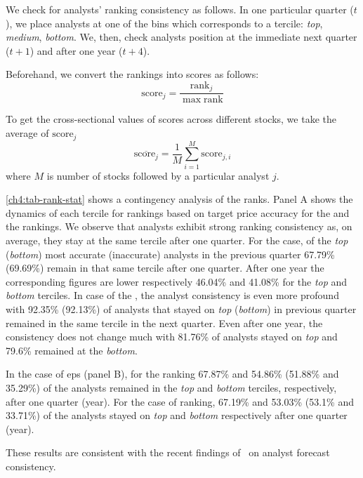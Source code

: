 \documentclass[a4paper,twoside,12pt,openright,notitlepage]{report}\usepackage[]{graphicx}\usepackage[]{color}
\begin{document}
We check for analysts' ranking consistency as follows.   In one particular quarter ($t$), we place  analysts at one of the bins which corresponds to a tercile: \textit{top}, \textit{medium}, \textit{bottom}. We, then,  check analysts position at the immediate next quarter ($t+1$) and after one year ($t+4$).

Beforehand, we convert the rankings into scores as follows:
\begin{equation}
\mathrm{score}_{j}=\frac{\mathrm{rank}_{j}}{\max{\mathrm{rank}}}
\end{equation}

To get the cross-sectional values of scores across different stocks, we take the average of $\mathrm{score}_{j}$
\begin{equation}
\label{ch4-eq:mean-score}
\overline{\mathrm{score}_{j}}= \frac{1}{M} \sum_{i=1}^{M} \mathrm{score}_{j,i}
\end{equation}
where $M$ is number of stocks followed by a particular analyst $j$.

\ref{ch4:tab-rank-stat} shows a contingency analysis of the ranks. Panel A shows the dynamics of each tercile for rankings based on target price  accuracy for the \naive{} and the  rankings. We observe that analysts exhibit strong ranking consistency as, on average, they stay at the same tercile after one quarter. For the \naive{} case, of the \textit{top} (\textit{bottom}) most accurate (inaccurate) analysts in the previous quarter 67.79\% (69.69\%) remain in that same tercile after one quarter. After one year the corresponding figures are lower respectively 46.04\% and 41.08\% for the \textit{top} and \textit{bottom} terciles. In case of the , the analyst consistency is even more profound with 92.35\% (92.13\%) of analysts that stayed on \textit{top} (\textit{bottom}) in previous quarter remained in the same tercile in the next quarter. Even after one year, the consistency does not change much with 81.76\% of analysts stayed on \textit{top} and 79.6\% remained at the \textit{bottom}.

In the case of \gls{eps} (panel B), for the  \naive{} ranking   67.87\% and  54.86\% (51.88\% and  35.29\%) of the analysts  remained in the \textit{top} and \textit{bottom} terciles, respectively,  after one quarter (year). For the case of  ranking, 67.19\% and  53.03\% (53.1\% and  33.71\%) of the analysts stayed on \textit{top} and \textit{bottom} respectively after one quarter (year).

These results are consistent with the recent findings of~\cite{hilary2013} on analyst forecast consistency.
\end{document}
